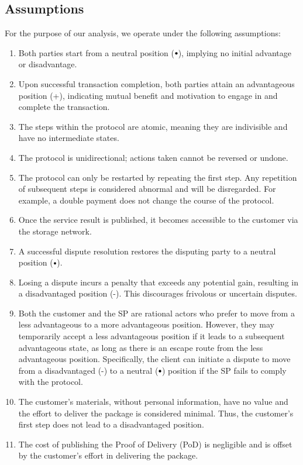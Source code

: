 \documentclass[pdftex,twocolumn,epjc3]{svjour3}
\newcommand{\plus}{+}
\newcommand{\minus}{-}
\newcommand\neutral[1][.75]{\mathbin{\ThisStyle{\vcenter{\hbox{%
  \scalebox{#1}{$\SavedStyle\bullet$}}}}}%
}
\begin{document}
\subsection{Assumptions}\label{sec:assumptions}

For the purpose of our analysis, we operate under the following assumptions:

\begin{enumerate}
\item Both parties start from a neutral position ($\neutral{}$), implying no initial advantage or disadvantage.
\item Upon successful transaction completion, both parties attain an advantageous position (\plus{}), indicating mutual benefit and motivation to engage in and complete the transaction.
\item The steps within the protocol are atomic, meaning they are indivisible and have no intermediate states.
\item The protocol is unidirectional; actions taken cannot be reversed or undone.
\item The protocol can only be restarted by repeating the first step. Any repetition of subsequent steps is considered abnormal and will be disregarded. For example, a double payment does not change the course of the protocol.
\item Once the service result is published, it becomes accessible to the customer via the storage network.
\item A successful dispute resolution restores the disputing party to a neutral position ($\neutral{}$).
\item Losing a dispute incurs a penalty that exceeds any potential gain, resulting in a disadvantaged position (\minus{}). This discourages frivolous or uncertain disputes.
\item Both the customer and the SP are rational actors who prefer to move from a less advantageous to a more advantageous position. However, they may temporarily accept a less advantageous position if it leads to a subsequent advantageous state, as long as there is an escape route from the less advantageous position. Specifically, the client can initiate a dispute to move from a disadvantaged (\minus{}) to a neutral ($\neutral{}$) position if the SP fails to comply with the protocol.
\item The customer's materials, without personal information, have no value and the effort to deliver the package is considered minimal. Thus, the customer's first step does not lead to a disadvantaged position.
\item The cost of publishing the Proof of Delivery (PoD) is negligible and is offset by the customer's effort in delivering the package.
\end{enumerate}
\end{document}
